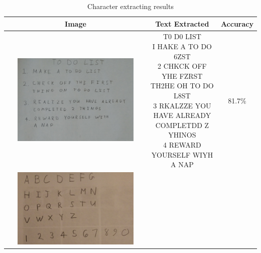 \documentclass[11pt]{article}
\begin{document}
\begin{table}[h!]
    \centering
    \caption{Character extracting results}\label{tbl:q_4_4}
    \begin{tabular}{ | c | c |c | }
      \hline
      Image & Text Extracted & Accuracy \\ \hline
      \begin{minipage}{.3\textwidth}
        \includegraphics[width=0.85\textwidth]{figures/01_list.jpg}
      \end{minipage}
      &
      \makecell{T0 D0 LIST \\I HAKE A TO DO 6ZST\\2 CHKCK OFF YHE FZRST\\TH2HE OH TO DO L8ST\\3 RKALZZE YOU HAVE ALREADY\\COMPLETDD Z YHINOS\\4 REWARD YOURSELF WIYH\\A NAP} 
      & 
      81.7\%
      \\  \hline
      \begin{minipage}{.3\textwidth}
        \includegraphics[width=0.85\textwidth]{figures/02_letters.jpg}

\end{minipage}
\end{tabular}
\end{table}
\end{document}
